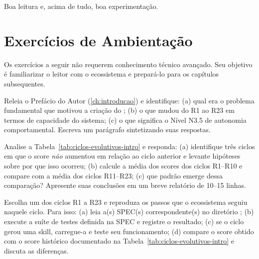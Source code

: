 Boa leitura e, acima de tudo, boa experimentação.

\section{Exercícios de Ambientação}

Os exercícios a seguir não requerem conhecimento técnico avançado. Seu
objetivo é familiarizar o leitor com o ecossistema e prepará-lo para os
capítulos subsequentes.

\begin{exercicio}
    Releia o Prefácio do Autor (\ref{ch:introducao}) e identifique:
    (a) qual era o problema fundamental que motivou a criação do
    \opencodeeco{}; (b) o que mudou do R1 ao R23 em termos de
    capacidade do sistema; (c) o que significa o Nível N3.5 de
    autonomia comportamental. Escreva um parágrafo sintetizando suas
    respostas.
\end{exercicio}

\begin{exercicio}
    Analise a Tabela~\ref{tab:ciclos-evolutivos-intro} e responda:
    (a) identifique três ciclos em que o score \emph{não} aumentou em
    relação ao ciclo anterior e levante hipóteses sobre por que isso
    ocorreu; (b) calcule a média dos scores dos ciclos R1--R10 e
    compare com a média dos ciclos R11--R23; (c) que padrão emerge
    dessa comparação? Apresente suas conclusões em um breve relatório
    de 10--15 linhas.
\end{exercicio}

\begin{exercicio}
    Escolha um dos ciclos R1 a R23 e reproduza os passos que o
    ecossistema seguiu naquele ciclo. Para isso: (a) leia a(s) SPEC(s)
    correspondente(s) no diretório ; (b) execute a
    suíte de testes definida na SPEC e registre o resultado; (c) se o
    ciclo gerou uma skill, carregue-a e teste seu funcionamento;
    (d) compare o score obtido com o score histórico documentado na
    Tabela~\ref{tab:ciclos-evolutivos-intro} e discuta as diferenças.
\end{exercicio}
